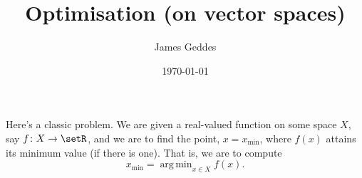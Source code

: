 \documentclass[10pt, twocolumn, a4paper]{article}
\author{James Geddes}
\date{\today}
\title{Optimisation (on vector spaces)}
\DeclareMathOperator*{\argmin}{arg\,min}
\begin{document}
\maketitle
\raggedright

Here's a classic problem. We are given a real-valued function on some
space $X$, say $f\colon X\to \setR$, and we are to find the point, $x =
x_\text{min}$, where $f(x)$ attains its minimum value (if there is
one). That is, we are to compute
\begin{equation*}
  x_\text{min} = \argmin_{x\in X} f(x).
\end{equation*}
\end{document}
